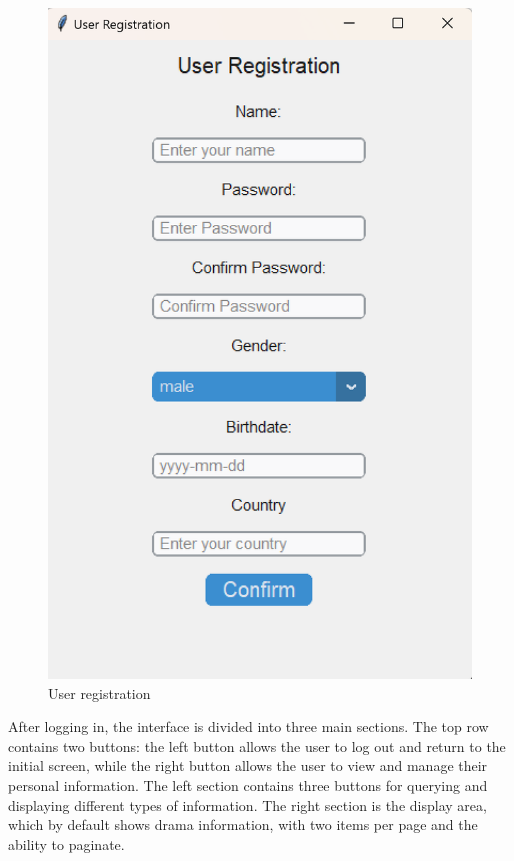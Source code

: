 \documentclass[12pt]{article}
\begin{document}
\begin{figure}[H]
\begin{minipage}{0.35\textwidth}
        \includegraphics[width=\textwidth]{5.png}
        \caption{User registration}
        \label{Figure 5}
    \end{minipage}
\end{figure}

\par After logging in, the interface is divided into three main sections. The top row contains two buttons: the left button allows the user to log out and return to the initial screen, while the right button allows the user to view and manage their personal information. The left section contains three buttons for querying and displaying different types of information. The right section is the display area, which by default shows drama information, with two items per page and the ability to paginate.
\end{document}
